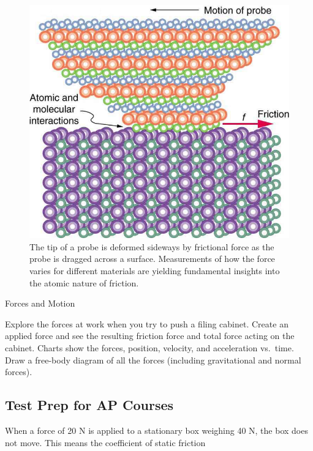 \documentclass[
]{book}
\begin{document}
\begin{figure}
\hypertarget{import-auto-id1165298744656}{%
\centering
\includegraphics{images/Figure_06_01_05a.jpg}
\caption{The tip of a probe is deformed sideways by frictional force as the
probe is dragged across a surface. Measurements of how the force varies
for different materials are yielding fundamental insights into the
atomic nature of
friction.}\label{import-auto-id1165298744656}
}
\end{figure}

\hypertarget{eip-440}{}
Forces and Motion

Explore the forces at work when you try to push a filing cabinet. Create
an applied force and see the resulting friction force and total force
acting on the cabinet. Charts show the forces, position, velocity, and
acceleration vs.~time. Draw a free-body diagram of all the forces
(including gravitational and normal forces). {\hfill\break
}

\hypertarget{fs-id1167067199007}{}

\hypertarget{import-auto-id0000006}{}
\hypertarget{test-prep-for-ap-courses-15}{%
\subsection{Test Prep for AP Courses}\label{test-prep-for-ap-courses-15}}

\hypertarget{import-auto-id0000007}{}
\leavevmode{}%
When a force of 20 N is applied to a stationary box weighing 40 N, the
box does not move. This means the coefficient of static friction
\end{document}
